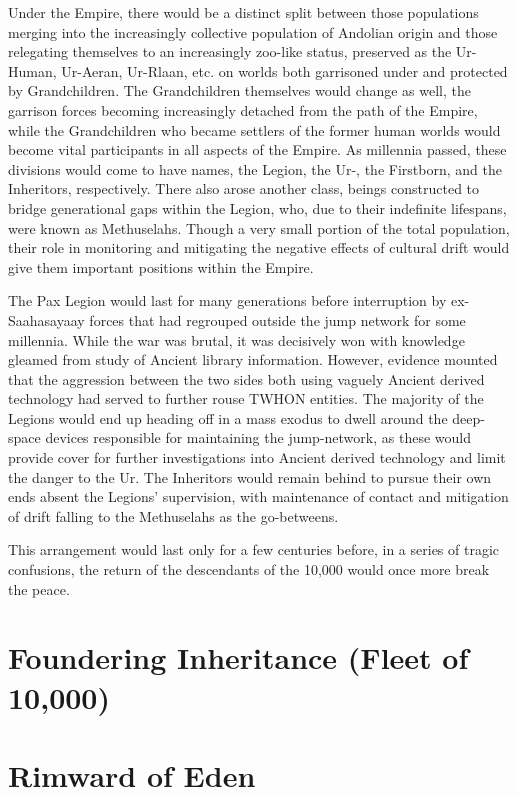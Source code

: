 Under the Empire, there would be a distinct split between those
populations merging into the increasingly collective population of
Andolian origin and those relegating themselves to an increasingly
zoo-like status, preserved as the Ur-Human, Ur-Aeran, Ur-Rlaan,
etc. on worlds both garrisoned under and protected by
Grandchildren. The Grandchildren themselves would change as well, the
garrison forces becoming increasingly detached from the path of the
Empire, while the Grandchildren who became settlers of the former
human worlds would become vital participants in all aspects of the
Empire. As millennia passed, these divisions would come to have names,
the Legion, the Ur-, the Firstborn, and the Inheritors,
respectively. There also arose another class, beings constructed to
bridge generational gaps within the Legion, who, due to their
indefinite lifespans, were known as Methuselahs. Though a very small
portion of the total population, their role in monitoring and
mitigating the negative effects of cultural drift would give them
important positions within the Empire.

The Pax Legion would last for many generations before interruption by
ex-Saahasayaay forces that had regrouped outside the jump network for
some millennia. While the war was brutal, it was decisively won with
knowledge gleamed from study of Ancient library information. However,
evidence mounted that the aggression between the two sides both using
vaguely Ancient derived technology had served to further rouse TWHON
entities. The majority of the Legions would end up heading off in a
mass exodus to dwell around the deep-space devices responsible for
maintaining the jump-network, as these would provide cover for further
investigations into Ancient derived technology and limit the danger to
the Ur. The Inheritors would remain behind to pursue their own ends
absent the Legions' supervision, with maintenance of contact and
mitigation of drift falling to the Methuselahs as the go-betweens.

This arrangement would last only for a few centuries before, in a
series of tragic confusions, the return of the descendants of the
10,000 would once more break the peace.

\section{Foundering Inheritance (Fleet of 10,000)}
\section{Rimward of Eden}

